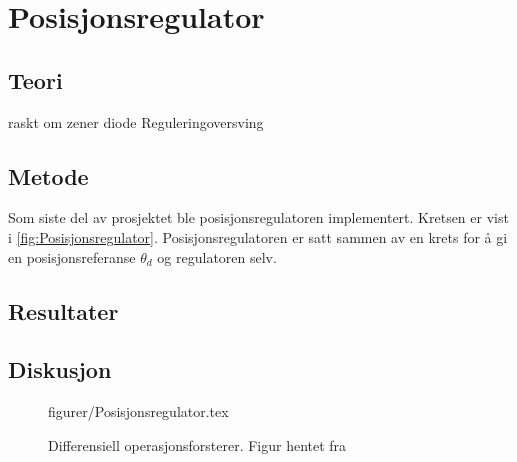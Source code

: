 \section{Posisjonsregulator}\label{sec:posisjonsregulator}

\subsection{Teori}


raskt om zener diode
Reguleringoversving







\subsection{Metode}

Som siste del av prosjektet ble posisjonsregulatoren implementert. Kretsen er vist i \autoref{fig:Posisjonsregulator}. Posisjonsregulatoren er satt sammen av en krets for å gi en posisjonsreferanse $\theta_d$ og regulatoren selv.








\subsection{Resultater}








\subsection{Diskusjon}







\begin{figure} [h]
    \centering
     {figurer/Posisjonsregulator.tex}
    \caption{Differensiell operasjonsforsterer. Figur hentet fra \cite{AnalogMotorlabbOppgaver}}
    \label{fig:Posisjonsregulator}
\end{figure}

